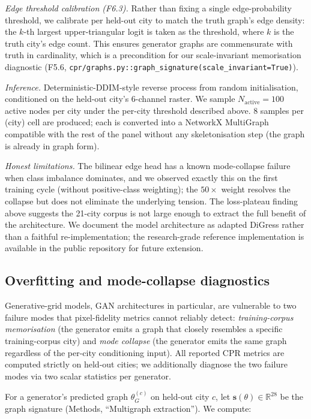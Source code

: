 \documentclass[10pt,a4paper]{article}
\begin{document}
\textit{Edge threshold calibration (F6.3).} Rather than fixing
a single edge-probability threshold, we calibrate per held-out
city to match the truth graph's edge density: the $k$-th largest
upper-triangular logit is taken as the threshold, where $k$ is
the truth city's edge count. This ensures generator graphs are
commensurate with truth in cardinality, which is a precondition
for our scale-invariant memorisation diagnostic
(F5.6, \texttt{cpr/graphs.py::graph\_signature(scale\_invariant=True)}).

\textit{Inference.} Deterministic-DDIM-style reverse process
from random initialisation, conditioned on the held-out city's
6-channel raster. We sample $N_{\mathrm{active}} = 100$ active
nodes per city under the per-city threshold described above.
8 samples per (city) cell are produced; each is converted into a
NetworkX MultiGraph compatible with the rest of the panel
without any skeletonisation step (the graph is already in graph
form).

\textit{Honest limitations.} The bilinear edge head has a known
mode-collapse failure when class imbalance dominates, and we
observed exactly this on the first training cycle (without
positive-class weighting); the $50\times$ weight resolves the
collapse but does not eliminate the underlying tension. The
loss-plateau finding above suggests the 21-city corpus is not
large enough to extract the full benefit of the architecture.
We document the model architecture as adapted DiGress rather
than a faithful re-implementation; the research-grade reference
implementation is available in the public repository for future
extension.

\subsection{Overfitting and mode-collapse diagnostics}

Generative-grid models, GAN architectures in particular, are
vulnerable to two failure modes that pixel-fidelity metrics
cannot reliably detect: \emph{training-corpus memorisation} (the
generator emits a graph that closely resembles a specific
training-corpus city) and \emph{mode collapse} (the generator
emits the same graph regardless of the per-city conditioning
input). All reported CPR metrics are computed strictly on
held-out cities; we additionally diagnose the two failure modes
via two scalar statistics per generator.

For a generator's predicted graph $\theta_G^{(c)}$ on held-out
city $c$, let $\mathbf{s}(\theta) \in \mathbb{R}^{28}$ be the
graph signature (Methods, ``Multigraph extraction''). We compute:
\end{document}

